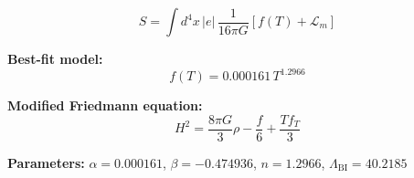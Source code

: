 
\begin{equation}
  S = \int d^4x \, |e| \, \frac{1}{16\pi G} \left[ f(T) + \mathcal{L}_m \right]
\end{equation}

\textbf{Best-fit model:}
\begin{equation}
  f(T) = 0.000161 \, T^{1.2966}
\end{equation}

\textbf{Modified Friedmann equation:}
\begin{equation}
  H^2 = \frac{8\pi G}{3} \rho - \frac{f}{6} + \frac{T f_T}{3}
\end{equation}

\textbf{Parameters:}
$\alpha = 0.000161$, \quad
$\beta = -0.474936$, \quad
$n = 1.2966$, \quad
$\Lambda_{\text{BI}} = 40.2185$